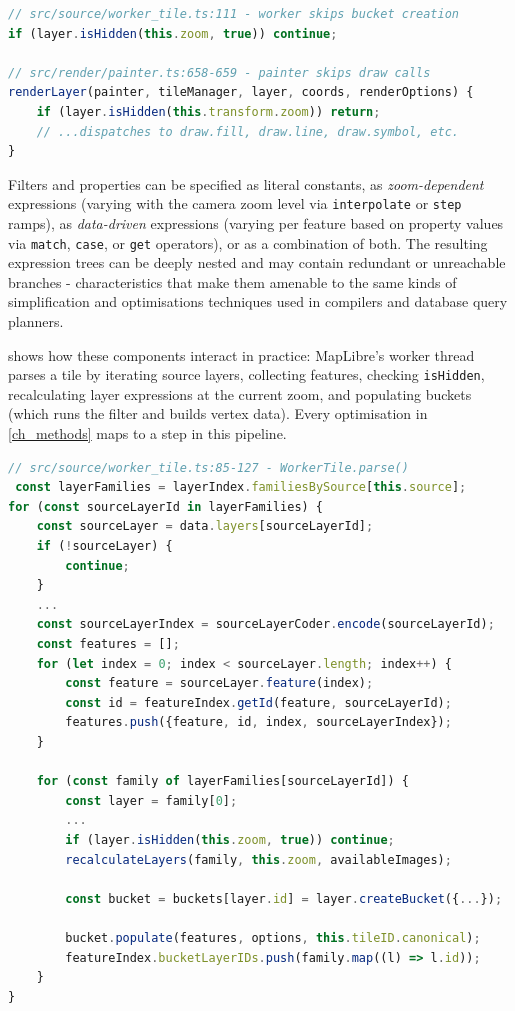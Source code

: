 \begin{itemize}
\begin{itemize}
\begin{lstlisting}[language=TypeScript,caption={MapLibre GL-JS usages of \texttt{isHidden}},label=lst:ishidden_usage]
// src/source/worker_tile.ts:111 - worker skips bucket creation
if (layer.isHidden(this.zoom, true)) continue;

// src/render/painter.ts:658-659 - painter skips draw calls
renderLayer(painter, tileManager, layer, coords, renderOptions) {
    if (layer.isHidden(this.transform.zoom)) return;
    // ...dispatches to draw.fill, draw.line, draw.symbol, etc.
}
\end{lstlisting}
\end{itemize}
\end{itemize}

Filters and properties can be specified as literal constants, as \emph{zoom-dependent} expressions (varying with the camera zoom level via \texttt{interpolate} or \texttt{step} ramps), as \emph{data-driven} expressions (varying per feature based on property values via \texttt{match}, \texttt{case}, or \texttt{get} operators), or as a combination of both.
The resulting expression trees can be deeply nested and may contain redundant or unreachable branches - characteristics that make them amenable to the same kinds of simplification and optimisations techniques used in compilers and database query planners.

 shows how these components interact in practice: MapLibre's worker thread parses a tile by iterating source layers, collecting features, checking \texttt{isHidden}, recalculating layer expressions at the current zoom, and populating buckets (which runs the filter and builds vertex data).
Every optimisation in \cref{ch_methods} maps to a step in this pipeline.

\begin{lstlisting}[language=TypeScript,caption={MapLibre GL-JS worker tile processing pipeline (\texttt{src/source/worker\_tile.ts:85-127})},label=lst:worker_pipeline]
// src/source/worker_tile.ts:85-127 - WorkerTile.parse()
 const layerFamilies = layerIndex.familiesBySource[this.source];
for (const sourceLayerId in layerFamilies) {
    const sourceLayer = data.layers[sourceLayerId];
    if (!sourceLayer) {
        continue;
    }
    ...
    const sourceLayerIndex = sourceLayerCoder.encode(sourceLayerId);
    const features = [];
    for (let index = 0; index < sourceLayer.length; index++) {
        const feature = sourceLayer.feature(index);
        const id = featureIndex.getId(feature, sourceLayerId);
        features.push({feature, id, index, sourceLayerIndex});
    }

    for (const family of layerFamilies[sourceLayerId]) {
        const layer = family[0];
        ...
        if (layer.isHidden(this.zoom, true)) continue;
        recalculateLayers(family, this.zoom, availableImages);

        const bucket = buckets[layer.id] = layer.createBucket({...});

        bucket.populate(features, options, this.tileID.canonical);
        featureIndex.bucketLayerIDs.push(family.map((l) => l.id));
    }
}
\end{lstlisting}


